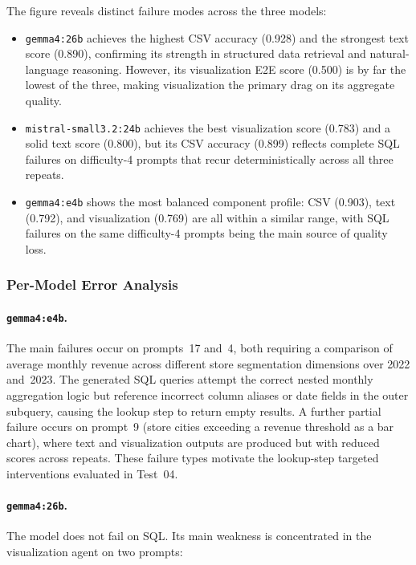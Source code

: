 The figure reveals distinct failure modes across the three models:

\begin{itemize}
    \item \texttt{gemma4:26b} achieves the highest CSV accuracy (0.928) and
          the strongest text score (0.890), confirming its strength in
          structured data retrieval and natural-language reasoning. However,
          its visualization E2E score (0.500) is by far the lowest of the
          three, making visualization the primary drag on its aggregate quality.

    \item \texttt{mistral-\allowbreak small3.2:24b} achieves the best visualization score
          (0.783) and a solid text score (0.800), but its CSV accuracy (0.899)
          reflects complete SQL failures on difficulty-4 prompts that recur
          deterministically across all three repeats.

    \item \texttt{gemma4:e4b} shows the most balanced component profile:
          CSV (0.903), text (0.792), and visualization (0.769) are all within
          a similar range, with SQL failures on the same difficulty-4 prompts
          being the main source of quality loss.
\end{itemize}

\subsubsection{Per-Model Error Analysis}
\label{subsubsec:test01errors}

\paragraph{\texttt{gemma4:e4b}.}
The main failures occur on prompts~17 and~4, both requiring a comparison of
average monthly revenue across different store segmentation dimensions over
2022 and~2023. The generated SQL queries attempt the correct nested monthly
aggregation logic but reference incorrect column aliases or date fields in the
outer subquery, causing the lookup step to return empty results. A further
partial failure occurs on prompt~9 (store cities exceeding a revenue threshold
as a bar chart), where text and visualization outputs are produced but with
reduced scores across repeats. These failure types motivate the lookup-step
targeted interventions evaluated in Test~04.

\paragraph{\texttt{gemma4:26b}.}
The model does not fail on SQL. Its main weakness is concentrated in the
visualization agent on two prompts:

